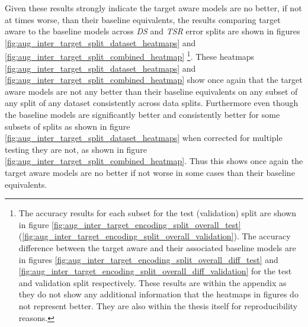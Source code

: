 Given these results strongly indicate the target aware models are no better, if not at times worse, than their baseline equivalents, the results comparing target aware to the baseline models across \textit{DS} and \textit{TSR} error splits are shown in figures \ref{fig:aug_inter_target_split_dataset_heatmaps} and \ref{fig:aug_inter_target_split_combined_heatmap} \footnote{The accuracy results for each subset for the test (validation) split are shown in figure \ref{fig:aug_inter_target_encoding_split_overall_test} (\ref{fig:aug_inter_target_encoding_split_overall_validation}). The accuracy difference between the target aware and their associated baseline models are in figures \ref{fig:aug_inter_target_encoding_split_overall_diff_test} and \ref{fig:aug_inter_target_encoding_split_overall_diff_validation} for the test and validation split respectively. These results are within the appendix as they do not show any additional information that the heatmaps in figures do not represent better. They are also within the thesis itself for reproducibility reasons.}. These heatmaps \ref{fig:aug_inter_target_split_dataset_heatmaps} and \ref{fig:aug_inter_target_split_combined_heatmap} show once again that the target aware models are not any better than their baseline equivalents on any subset of any split of any dataset consistently across data splits. Furthermore even though the baseline models are significantly better and consistently better for some subsets of splits as shown in figure \ref{fig:aug_inter_target_split_dataset_heatmaps} when corrected for multiple testing they are not, as shown in figure \ref{fig:aug_inter_target_split_combined_heatmap}. Thus this shows once again the target aware models are no better if not worse in some cases than their baseline equivalents.


